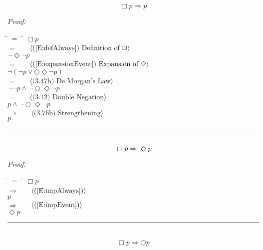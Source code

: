 \documentclass[fleqn, leqno]{article}
\newcommand{\lgap}{2pt}                             %
\newcommand{\mymathindent}{24pt}                      %
\newcommand{\Next}{\bigcirc}
\newcommand{\Event}{\Diamond}
\newcommand{\Always}{\Box}
\newcommand{\myqed}{\hfill\rule[-.23ex]{1.2ex}{2.0ex}}
\newcommand{\Gll} {\langle}                         %
\newcommand{\Ggg} {\rangle}                         %
\newcommand{\Hint}[1]     {\ \ \ $\Gll              \mbox{#1} \Ggg$ }   %
\begin{document}
\begin{equation}\label{E:impAlways}
\Always p \Rightarrow p
\end{equation}

\emph{Proof:}
\begin{tabbing}
\hspace{\mymathindent} \= $= \;$ \= \kill
  \> \>   $\Always p$\\[\lgap]
  \> $=$  \>  \Hint{(\ref{E:defAlways}) Definition of $\Always$}\\[\lgap]
  \> \>   $\lnot\Event\lnot p$\\[\lgap]
  \> $=$  \>  \Hint{(\ref{E:expansionEvent}) Expansion of $\Event$}\\[\lgap]
  \> \>   $\lnot(\lnot p \lor \Next\Event\lnot p)$\\[\lgap]
  \> $=$  \>  \Hint{(3.47b) De Morgan's Law}\\[\lgap]
  \> \>   $\lnot\lnot p \land \lnot\Next\Event\lnot p$\\[\lgap]
  \> $=$  \>  \Hint{(3.12) Double Negation}\\[\lgap]
  \> \>   $p \land \lnot\Next\Event\lnot p$\\[\lgap]
  \> $\Rightarrow$  \>  \Hint{(3.76b) Strengthening}\\[\lgap]
  \> \>   $p$\\[\lgap]
\end{tabbing}
\myqed\\[\lgap]


\begin{equation}\label{E:impAlwaysE}
\Always p \Rightarrow \Event p
\end{equation}

\emph{Proof:}
\begin{tabbing}
\hspace{\mymathindent} \= $= \;$ \= \kill
  \> \>   $\Always p$\\[\lgap]
  \> $\Rightarrow$  \>  \Hint{(\ref{E:impAlways})}\\[\lgap]
  \> \>   $p$\\[\lgap]
  \> $\Rightarrow$  \>  \Hint{(\ref{E:impEvent})}\\[\lgap]
  \> \>   $\Event p$\\[\lgap]
\end{tabbing}
\myqed\\[\lgap]


\begin{equation}\label{E:impAlwaysN}
\Always p \Rightarrow \Next p
\end{equation}
\end{document}
